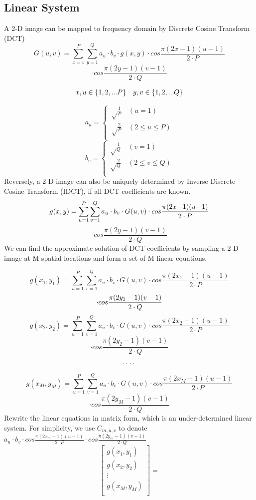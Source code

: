 \documentclass{article}
\begin{document}
\subsection{Linear System}
A 2-D image can be mapped to frequency domain by Discrete Cosine Transform (DCT)
$$
G(u,v)=
\sum^P_{x=1}\sum^Q_{y=1}a_u \cdot b_v \cdot g(x,y) \cdot cos \frac{\pi(2x \!-\! 1)(u\!-\!1)}{2 \cdot P}
$$
$$
\cdot cos \frac{\pi (2y \!-\! 1)(v\!-\!1)}{2 \cdot Q}
$$

$$
x,u \in \{1,2,...P\}\quad
y,v \in \{1,2,...Q\}\\
$$

$$
a_u=\left\{
\begin{aligned}
\sqrt \frac{1}{P} &\ (u=1)\\
\sqrt \frac{2}{P} &\ (2 \leq u \leq P)\\
\end{aligned}
\right.
$$
$$
b_v=\left\{
\begin{aligned}
\sqrt \frac{1}{Q} &\ (v=1)\\
\sqrt \frac{2}{Q} &\ (2 \leq v \leq Q)\\
\end{aligned}
\right.
$$
Reversely, a 2-D image can also be uniquely determined by Inverse Discrete Cosine Transform (IDCT), if all DCT coefficients are known.
$$
g(x,y)=
\sum^P_{u=1}\sum^Q_{v=1}a_u \cdot b_v \cdot G(u,v) \cdot cos \frac{\pi(2x\!-\!1)(u\!-\!1)}{2 \cdot P}\\
$$
$$
\cdot cos \frac{\pi (2y\!-\!1)(v\!-\!1)}{2 \cdot Q}
$$
We can find the approximate solution of DCT coefficients by sampling a 2-D image at M spatial locations and form a set of M linear equations.

$$
g(x_1, y_1) = \sum^P_{u=1}\sum^Q_{v=1}a_u \cdot b_v \cdot G(u,v) \cdot cos \frac{\pi(2x_1-1)(u-1)}{2 \cdot P}
$$
$$
\cdot cos \frac{\pi (2y_1-1)(v-1)}{2 \cdot Q}\\
$$
$$
g(x_2, y_2) = \sum^P_{u=1}\sum^Q_{v=1}a_u \cdot b_v \cdot G(u,v) \cdot cos \frac{\pi(2x_2-1)(u-1)}{2 \cdot P}
$$
$$
\cdot cos \frac{\pi (2y_2-1)(v-1)}{2 \cdot Q}
$$
$$
\cdot \cdot \cdot \cdot\\
$$
$$
g(x_M, y_M) = \sum^P_{u=1}\sum^Q_{v=1}a_u \cdot b_v \cdot G(u,v) \cdot cos \frac{\pi(2x_M-1)(u-1)}{2 \cdot P}
$$
$$
\cdot cos \frac{\pi (2y_M-1)(v-1)}{2 \cdot Q}
$$
Rewrite the linear equations in matrix form, which is an under-determined linear system. For simplicity, we use 
$ C_{m,u,v}$ to denote $ a_u \cdot b_v \cdot cos \frac{\pi(2x_m-1)(u-1)}{2 \cdot P} \cdot cos \frac{\pi (2y_m-1)(v-1)}{2 \cdot Q}$
$$
\begin{bmatrix}
g(x_1,y_1)\\
g(x_2,y_2)\\
\vdots\\
g(x_M,y_M)\\
\end{bmatrix}=
$$
\end{document}
